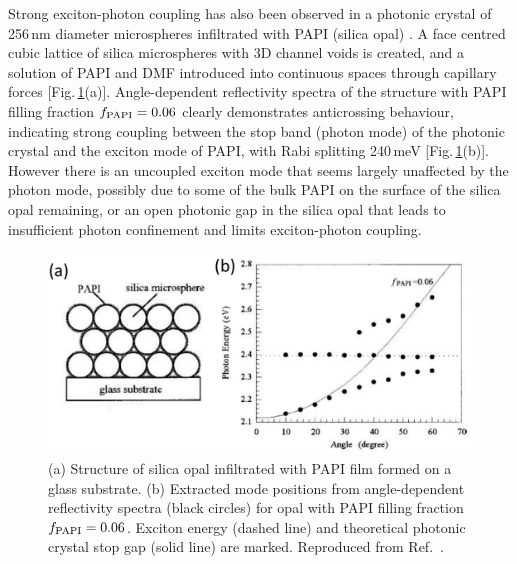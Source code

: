 Strong exciton-photon coupling has also been observed in a photonic crystal of 256\,nm diameter microspheres infiltrated with PAPI (silica opal) \cite{Sumioka2001}. A face centred cubic lattice of silica microspheres with 3D channel voids is created, and a solution of PAPI and DMF introduced into continuous spaces through capillary forces [Fig.\,\ref{2Fig21}(a)]. Angle-dependent reflectivity spectra of the structure with PAPI filling fraction $f_{\textnormal{PAPI}}=0.06$ clearly demonstrates anticrossing behaviour, indicating strong coupling between the stop band (photon mode) of the photonic crystal and the exciton mode of PAPI, with Rabi splitting 240\,meV [Fig.\,\ref{2Fig21}(b)]. However there is an uncoupled exciton mode that seems largely unaffected by the photon mode, possibly due to some of the bulk PAPI on the surface of the silica opal remaining, or an open photonic gap in the silica opal that leads to insufficient photon confinement and limits exciton-photon coupling. 
\begin{figure}[h!]
\centering
\includegraphics[width=\textwidth]{Fig21}
\caption{(a) Structure of silica opal infiltrated with PAPI film formed on a glass substrate. (b) Extracted mode positions from angle-dependent reflectivity spectra (black circles) for opal with PAPI filling fraction $f_{\textnormal{PAPI}}=0.06$. Exciton energy (dashed line) and theoretical photonic crystal stop gap (solid line) are marked. Reproduced from Ref.\ \cite{Sumioka2001}.}
\label{2Fig21}
\end{figure}


